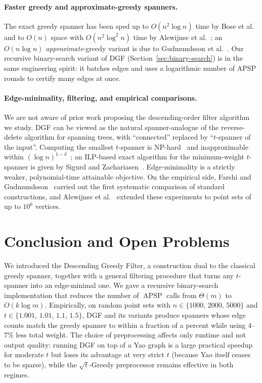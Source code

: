 \documentclass{cccg26}
\DeclareMathOperator{\APSP}{APSP}
\begin{document}
\paragraph{Faster greedy and approximate-greedy spanners.}
The exact greedy spanner has been sped up to $O(n^2\log n)$ time by
Bose et al.~\cite{BCFMS10} and to $O(n)$ space with $O(n^2\log^2 n)$
time by Alewijnse et al.~\cite{ABBB15}; an $O(n\log n)$
\emph{approximate}-greedy variant is due to Gudmundsson et
al.~\cite{GLN02}. Our recursive binary-search variant of DGF
(Section~\ref{sec:binary-search}) is in the same engineering spirit:
it batches edges and uses a logarithmic number of APSP rounds to
certify many edges at once.

\paragraph{Edge-minimality, filtering, and empirical comparisons.}
We are not aware of prior work proposing the descending-order filter
algorithm we study. DGF can be viewed as the natural spanner-analogue
of the reverse-delete algorithm for spanning trees, with ``connected''
replaced by ``$t$-spanner of the input''. Computing the smallest
$t$-spanner is NP-hard~\cite{Cai94} and inapproximable within
$(\log n)^{1-\delta}$~\cite{Kortsarz01}; an ILP-based exact algorithm
for the minimum-weight $t$-spanner is given by Sigurd and
Zachariasen~\cite{SZ04}. Edge-minimality is a strictly weaker,
polynomial-time attainable objective. On the empirical side, Farshi
and Gudmundsson~\cite{FG09} carried out the first systematic
comparison of standard constructions, and Alewijnse et
al.~\cite{ABBB15} extended these experiments to point sets of up to
$10^6$ vertices.

\section{Conclusion and Open Problems}
\label{sec:open-problems}

We introduced the Descending Greedy Filter, a construction dual to the
classical greedy spanner, together with a general filtering procedure
that turns any $t$-spanner into an edge-minimal one. We gave a
recursive binary-search implementation that reduces the number of
$\APSP$ calls from $\Theta(m)$ to $O(k\log m)$. Empirically, on random
point sets with $n\in\{1000,\,2000,\,5000\}$ and
$t\in\{1.001,\,1.01,\,1.1,\,1.5\}$, DGF and its variants produce
spanners whose edge counts match the greedy spanner to within a
fraction of a percent while using $4$--$7\%$ less total weight. The
choice of preprocessing affects only runtime and not output quality:
running DGF on top of a Yao graph is a large practical speedup for
moderate $t$ but loses its advantage at very strict $t$ (because Yao
itself ceases to be sparse), while the $\sqrt{t}$-Greedy preprocessor
remains effective in both regimes.
\end{document}
